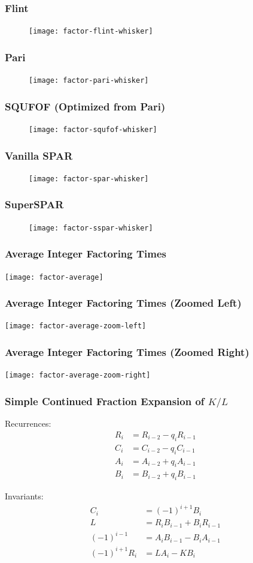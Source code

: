 \documentclass{beamer}
\begin{document}
\begin{frame}
\frametitle{Flint}
\begin{figure}
\texttt{[image: factor-flint-whisker]}
\end{figure}
\end{frame}
\begin{frame}
\frametitle{Pari}
\begin{figure}
\texttt{[image: factor-pari-whisker]}
\end{figure}
\end{frame}
\begin{frame}
\frametitle{SQUFOF (Optimized from Pari)}
\begin{figure}
\texttt{[image: factor-squfof-whisker]}
\end{figure}
\end{frame}
\begin{frame}
\frametitle{Vanilla SPAR}
\begin{figure}
\texttt{[image: factor-spar-whisker]}
\end{figure}
\end{frame}
\begin{frame}
\frametitle{SuperSPAR}
\begin{figure}
\texttt{[image: factor-sspar-whisker]}
\end{figure}
\end{frame}

\begin{frame}
\frametitle{Average Integer Factoring Times}
\texttt{[image: factor-average]}
\end{frame}
\begin{frame}
\frametitle{Average Integer Factoring Times (Zoomed Left)}
\texttt{[image: factor-average-zoom-left]}
\end{frame}
\begin{frame}
\frametitle{Average Integer Factoring Times (Zoomed Right)}
\texttt{[image: factor-average-zoom-right]}
\end{frame}

\begin{frame}
\frametitle{Simple Continued Fraction Expansion of $K / L$}
Recurrences:
\begin{align*}
R_i &= R_{i-2} - q_i R_{i-1} \\
C_i &= C_{i-2} - q_i C_{i-1} \\
A_i &= A_{i-2} + q_i A_{i-1} \\
B_i &= B_{i-2} + q_i B_{i-1}
\end{align*}

Invariants:
\begin{align*}
C_i &= (-1)^{i+1} B_i \\
L &= R_iB_{i-1} + B_iR_{i-1} \\
(-1)^{i-1} &= A_iB_{i-1} - B_iA_{i-1} \\
(-1)^{i+1} R_i &= LA_i - KB_i \\
\end{align*}
\end{frame}
\end{document}
